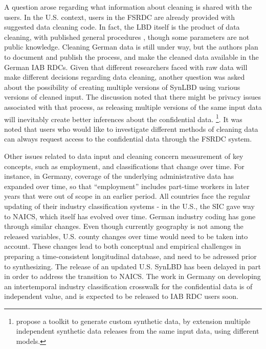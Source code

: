\documentclass[letterpaper,12pt]{article}
\begin{document}
A question arose regarding what information about cleaning is shared with the users. In the U.S. context, users in the \ac{FSRDC} are already provided with suggested data cleaning code. In fact, the LBD itself is the product of data cleaning, with published general procedures \citep{MirandaJarmin2002}, though some parameters are not public knowledge.  Cleaning German data is still under way,  but the authors plan to document and publish the process, and make the cleaned data available in the German \ac{IAB}  \acp{RDC}. Given that different researchers faced with raw data will make different decisions regarding data cleaning, another question was asked about the possibility of creating multiple versions of SynLBD using various versions of cleaned input. The discussion noted that  there might be privacy issues associated with that process, as releasing multiple versions of the same input data will inevitably create better inferences about the confidential data.%
\footnote{\cite{synthpop2016} propose a toolkit to generate custom synthetic data, by extension multiple independent synthetic data releases from the same input data, using different models.}. It was noted that users who would like to investigate different methods of cleaning data can always request access to the confidential data through the \ac{FSRDC} system. 




Other issues related to data input and cleaning concern measurement of key concepts, such as employment, and classifications that change over time. For instance, in Germany, coverage of the underlying administrative data has expanded over time, so that ``employment'' includes part-time workers in later years that were out of scope in an earlier period. All countries face the regular updating of their industry classification systems - in the U.S., the \ac{SIC} gave way to \ac{NAICS}, which itself has evolved over time. German industry coding has gone through similar changes. Even though currently geography is not among the released variables, U.S. county changes over time would need to be taken into account. These changes lead to  both conceptual and empirical challenges in preparing a time-consistent longitudinal database, and need to be adressed prior to synthesizing. The release of an updated U.S. SynLBD has been delayed in part in order to address the transition to NAICS. The work in Germany on developing an intertemporal industry classification crosswalk for the confidential data is of independent value, and is expected to be released to IAB \ac{RDC} users soon.
\end{document}

